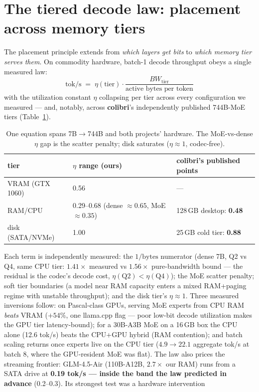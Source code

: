 \documentclass[10pt]{article}
\begin{document}
\section{The tiered decode law: placement across memory tiers}\label{sec:tierlaw}
The placement principle extends from \emph{which layers get bits} to \emph{which memory tier serves
them}. On commodity hardware, batch-1 decode throughput obeys a single measured law:
\[ \text{tok/s} \;=\; \eta(\text{tier}) \cdot \frac{BW_{\text{tier}}}{\text{active bytes per token}} \]
with the utilization constant $\eta$ collapsing per tier across every configuration we measured ---
and, notably, across \textbf{colibri}'s independently published 744B-MoE tiers
(Table~\ref{tab:eta}).
\begin{table}[h]\centering\small
\begin{tabular}{lll}
\toprule
tier & $\eta$ range (ours) & colibri's published points \\
\midrule
VRAM (GTX 1060) & 0.56 & --- \\
RAM/CPU & 0.29--0.68 (dense ${\approx}0.65$, MoE ${\approx}0.35$) & 128\,GB desktop: \textbf{0.48} \\
disk (SATA/NVMe) & 1.00 & 25\,GB cold tier: \textbf{0.88} \\
\bottomrule
\end{tabular}
\caption{One equation spans 7B$\to$744B and both projects' hardware. The MoE-vs-dense $\eta$ gap is the
scatter penalty; disk saturates ($\eta{\approx}1$, codec-free).}\label{tab:eta}
\end{table}
Each term is independently measured: the $1/\text{bytes}$ numerator (dense 7B, Q2 vs Q4, same CPU tier:
$1.41\times$ measured vs $1.56\times$ pure-bandwidth bound --- the residual is the codec's decode cost,
$\eta(\mathrm{Q2}){<}\eta(\mathrm{Q4})$); the MoE scatter penalty; soft tier boundaries (a model near RAM
capacity enters a mixed RAM+paging regime with unstable throughput); and the disk tier's
$\eta{\approx}1$. Three measured inversions follow: on Pascal-class GPUs, serving MoE experts from CPU
RAM \emph{beats} VRAM ($+54\%$, one llama.cpp flag --- poor low-bit decode utilization makes the GPU
tier latency-bound); for a 30B-A3B MoE on a 16\,GB box the CPU alone (12.6 tok/s) beats the CPU+GPU
hybrid (RAM contention); and batch scaling returns once experts live on the CPU tier ($4.9\to22.1$
aggregate tok/s at batch 8, where the GPU-resident MoE was flat). The law also prices the streaming
frontier: GLM-4.5-Air (110B-A12B, $2.7\times$ our RAM) runs from a SATA drive at \textbf{0.19 tok/s ---
inside the band the law predicted in advance} (0.2--0.3). Its strongest test was a hardware intervention
\end{document}
